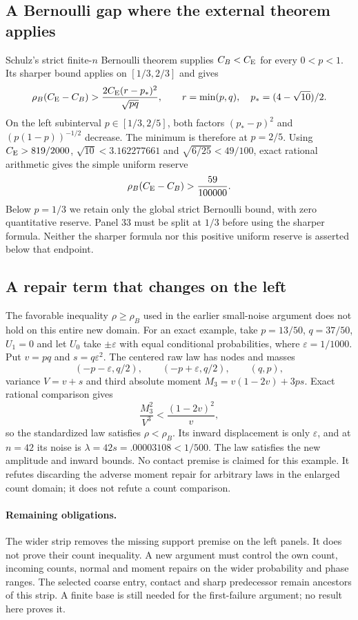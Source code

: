 \subsection{A Bernoulli gap where the external theorem applies}
Schulz's strict finite-$n$ Bernoulli theorem supplies $C_B<C_{\rm E}$
for every $0<p<1$. Its sharper bound applies on $[1/3,2/3]$ and gives
\[
 \rho_B(C_{\rm E}-C_B)
 >\frac{2C_{\rm E}(r-p_*)^2}{\sqrt{pq}},\qquad
 r=\min(p,q),\quad p_*=(4-\sqrt{10})/2.
\]
On the left subinterval $p\in[1/3,2/5]$, both factors
$(p_*-p)^2$ and $(p(1-p))^{-1/2}$ decrease. The minimum is therefore
at $p=2/5$. Using $C_{\rm E}>819/2000$,
$\sqrt{10}<3.162277661$ and $\sqrt{6/25}<49/100$, exact rational
arithmetic gives the simple uniform reserve
\[
 \rho_B(C_{\rm E}-C_B)>\frac{59}{100000}.
\]
Below $p=1/3$ we retain only the global strict Bernoulli bound, with
zero quantitative reserve. Panel 33 must be split at $1/3$ before using
the sharper formula. Neither the sharper formula nor this positive
uniform reserve is asserted below that endpoint.

\subsection{A repair term that changes on the left}
The favorable inequality $\rho\ge\rho_B$ used in the earlier small-noise
argument does not hold on this entire new domain. For an exact example,
take $p=13/50$, $q=37/50$, $U_1=0$ and let $U_0$ take
$\pm\varepsilon$ with equal conditional probabilities, where
$\varepsilon=1/1000$. Put $v=pq$ and $s=q\varepsilon^2$. The centered
raw law has nodes and masses
\[
 (-p-\varepsilon,q/2),\qquad(-p+\varepsilon,q/2),\qquad(q,p),
\]
variance $V=v+s$ and third absolute moment
$M_3=v(1-2v)+3ps$. Exact rational comparison gives
\[
 \frac{M_3^2}{V^3}<\frac{(1-2v)^2}{v},
\]
so the standardized law satisfies $\rho<\rho_B$. Its inward displacement
is only $\varepsilon$, and at $n=42$ its noise is
$\lambda=42s=.00003108<1/500$. The law satisfies the new amplitude and
inward bounds. No contact premise is claimed for this example.
It refutes discarding the adverse moment repair for arbitrary laws in
the enlarged count domain; it does not refute a count comparison.

\paragraph{Remaining obligations.}
The wider strip removes the missing support premise on the left panels.
It does not prove their count inequality. A new argument must control
the own count, incoming counts, normal and moment repairs on the wider
probability and phase ranges. The selected coarse entry, contact and
sharp predecessor remain ancestors of this strip. A finite base is
still needed for the first-failure argument; no result here proves it.
